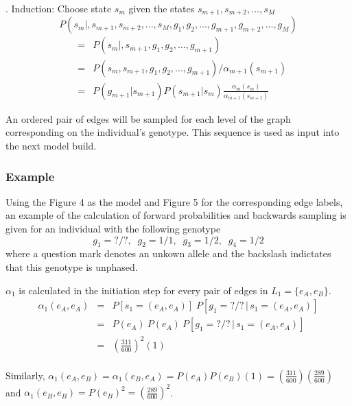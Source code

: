 \documentclass[a4paper,11pt,twoside,abstraction,titlepage]{article}
\begin{document}
\vspace{10pt}
. Induction: Choose state $s_m$ given the states $s_{m+1},s_{m+2},...,s_M$
\begin{equation*}
P(s_m|,s_{m+1},s_{m+2},...,s_M,g_1,g_2,...,g_{m+1},g_{m+2},...,g_M)
\end{equation*} \vspace{-25pt}
\begin{eqnarray*}
&=&  P(s_m|,s_{m+1},g_1,g_2,...,g_{m+1}) \\
&=& P(s_m,s_{m+1},g_1,g_2,...,g_{m+1})/\alpha_{m+1}(s_{m+1}) \\
&=& P(g_{m+1}|s_{m+1}) P(s_{m+1}|s_m) \frac{\alpha_m(s_m)}{\alpha_{m+1}(s_{m+1})}
\end{eqnarray*}

\noindent An ordered pair of edges will be sampled for each level of the graph corresponding on the individual's genotype.  This sequence is used as input into the next model build. \cite{beagle2}


\subsubsection{Example}
Using the Figure 4 as the model and Figure 5 for the corresponding edge labels, an example of the calculation of forward probabilities and backwards sampling is given for an individual with the following genotype
\begin{equation*}
g_1 = ?/?, \;\; g_2 = 1/1, \;\; g_3 = 1/2, \;\; g_4 = 1/2
\end{equation*}
where a question mark denotes an unkown allele and the backslash indictates that this genotype is unphased.
\vspace{10pt}

\noindent $\alpha_1$ is calculated in the initiation step for every pair of edges in $L_1 = \{e_{A}, e_{B}\}$.
\begin{eqnarray*}
\alpha_1(e_A,e_A) &=& P[s_1 = (e_A, e_A)] \; P[g_1=?/? \, | \, s_1 = (e_A,e_A)] \\
&=& P(e_A) \: P(e_A) \: P[g_1=?/? \, | \, s_1 = (e_A,e_A)] \\
&=& \left(\frac{311}{600}\right)^2\!\!(1)  \\
\end{eqnarray*}
\vspace{-20pt}

\noindent Similarly, $\alpha_1(e_A,e_B)  = \alpha_1(e_B,e_A)  = P(e_A)P(e_B)(1) = \left(\frac{311}{600}\right)\!\left(\frac{289}{600}\right)$ 
and $\alpha_1(e_B,e_B) = P(e_B)^2 = \left(\frac{289}{600}\right)^2$.
\end{document}
